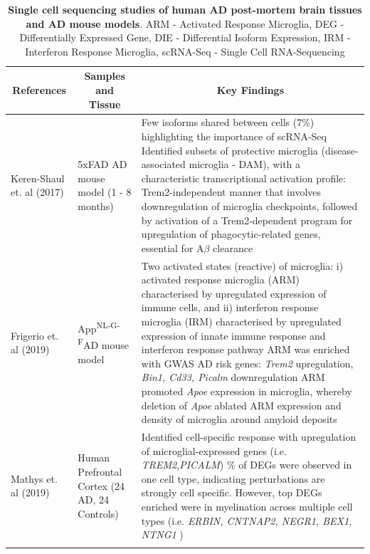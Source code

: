 \begin{changemargin}{1.5cm}
\begin{landscape}
		\begin{longtable}[c]{p{4cm}p{4cm}p{18cm}}
			\caption[Single cell sequencing studies of human AD post-mortem brain tissues and AD mouse models]%
			{\textbf{Single cell sequencing studies of human AD post-mortem brain tissues and AD mouse models}. ARM - Activated Response Microglia, DEG - Differentially Expressed Gene, DIE - Differential Isoform Expression, IRM - Interferon Response Microglia, scRNA-Seq - Single Cell RNA-Sequencing}
			\label{tab: longread_AD_advancedstudies}\\
			
			\toprule
			\multicolumn{1}{c}{References} &
			\multicolumn{1}{c}{Samples and Tissue} &
			\multicolumn{1}{c}{Key Findings} \\* \midrule
			\endfirsthead
			\endhead
			\bottomrule
			\endfoot
			\endlastfoot
			\centering Keren-Shaul et. al (2017)\cite{Keren-Shaul2017} &
			\centering 5xFAD AD mouse model (1 - 8 months) &
			\tabitem Few isoforms shared between cells (7\%) highlighting the importance of scRNA-Seq \newline
			\tabitem Identified subsets of protective microglia (disease-associated microglia - DAM), with a characteristic transcriptional activation profile:  Trem2-independent manner that involves downregulation of microglia checkpoints, followed by activation of a Trem2-dependent program for upregulation of phagocytic-related genes, essential for A$\beta$ clearance  \\
			\hdashline[0.5pt/5pt]	
			
			\centering Frigerio et. al (2019)\cite{Frigerio2019} &
			\centering App\textsuperscript{NL-G-F}\newline AD mouse model  &
			\tabitem Two activated states (reactive) of microglia: i) activated response microglia (ARM) characterised by upregulated expression of immune cells, and ii) interferon response microglia (IRM) characterised by upregulated expression of innate immune response and interferon response pathway  \newline
			\tabitem ARM was enriched with GWAS AD risk genes: \textit{Trem2} upregulation, \textit{Bin1, Cd33, Picalm} downregulation  \newline
			\tabitem ARM promoted \textit{Apoe} expression in microglia, whereby deletion of \textit{Apoe} ablated ARM expression and density of microglia around amyloid deposits \\
			\hdashline[0.5pt/5pt]
			
			\centering Mathys et. al (2019)\cite{Mathys2019} &
			\centering Human Prefrontal Cortex (24 AD, 24 Controls)  &
			\tabitem Identified cell-specific response with upregulation of microglial-expressed genes (i.e. \textit{TREM2},\textit{PICALM}) \newline
			\tabitem 95\% of DEGs were observed in one cell type, indicating perturbations are strongly cell specific.  However, top DEGs enriched were in myelination across multiple cell types (i.e. \textit{ERBIN, CNTNAP2, NEGR1, BEX1, NTNG1} )   \\
			\hdashline[0.5pt/5pt]
			

\end{longtable}
\end{landscape}
\end{changemargin}
